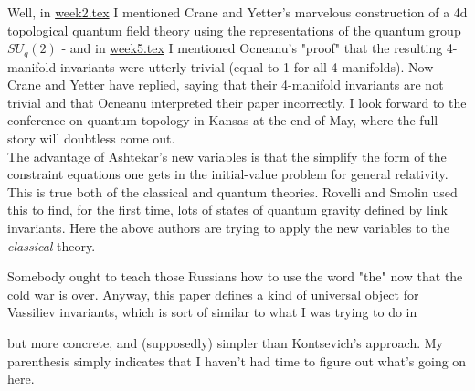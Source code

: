 Well, in {\hyperref[week2]{week2.tex}} I mentioned Crane and Yetter's marvelous construction of a 4d topological quantum field theory using the representations of the quantum group $SU_q(2)$ - and in {\hyperref[week5]{week5.tex}} I mentioned Ocneanu's "proof" that the resulting 4-manifold invariants were utterly trivial (equal to 1 for all 4-manifolds). Now Crane and Yetter have replied, saying that their 4-manifold invariants are not trivial and that Ocneanu interpreted their paper incorrectly. I look forward to the conference on quantum topology in Kansas at the end of May, where the full story will doubtless come out.
\\
The advantage of Ashtekar's new variables is that the simplify the form of the constraint equations one gets in the initial-value problem for general relativity. This is true both of the classical and quantum theories. Rovelli and Smolin used this to find, for the first time, lots of states of quantum gravity defined by link invariants. Here the above authors are trying to apply the new variables to the \textit{classical} theory.

Somebody ought to teach those Russians how to use the word "the" now that the cold war is over. Anyway, this paper defines a kind of universal object for Vassiliev invariants, which is sort of similar to what I was trying to do in


but more concrete, and (supposedly) simpler than Kontsevich's approach. My parenthesis simply indicates that I haven't had time to figure out what's going on here.


